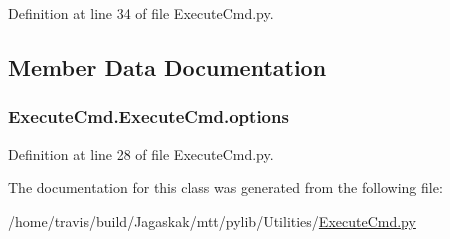 Definition at line 34 of file Execute\-Cmd.\-py.



\subsection{Member Data Documentation}
\hypertarget{classExecuteCmd_1_1ExecuteCmd_aea248b8edd01b26099f3d45b798a65be}{
\subsubsection[{options}]{\setlength{\rightskip}{0pt plus 5cm}Execute\-Cmd.\-Execute\-Cmd.\-options}}\label{classExecuteCmd_1_1ExecuteCmd_aea248b8edd01b26099f3d45b798a65be}


Definition at line 28 of file Execute\-Cmd.\-py.



The documentation for this class was generated from the following file\-:\begin{DoxyCompactItemize}
\item 
/home/travis/build/\-Jagaskak/mtt/pylib/\-Utilities/\hyperlink{ExecuteCmd_8py}{Execute\-Cmd.\-py}\end{DoxyCompactItemize}
